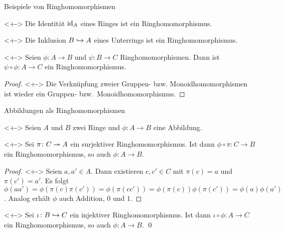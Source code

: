 \begin{frame}{Beispiele von Ringhomomorphismen}
    \begin{example}<+->
        Die Identität \(\operatorname{id}_A\) eines Ringes ist ein Ringhomomorphismus.
    \end{example}
    \begin{example}<+->
        Die Inklusion \(B \hookrightarrow A\) eines Unterrings ist ein Ringhomomorphismus.
    \end{example}
    \begin{proposition}<+->
        Seien \(\phi\colon A \to B\) und \(\psi\colon B \to C\)
        Ringhomomorphismen. Dann ist \(\psi \circ \phi\colon A \to C\) ein
        Ringhomomorphismus.
    \end{proposition}
    \begin{proof}<+->
        Die Verknüpfung zweier Gruppen- bzw. Monoidhomomorphismen ist wieder
        ein Gruppen- bzw.~Monoidhomomorphismus.
    \end{proof}
\end{frame}

\begin{frame}{Abbildungen als Ringhomomorphismen}
    \begin{visibleenv}<+->
        Seien \(A\) und \(B\) zwei Ringe und \(\phi\colon A \to B\) eine Abbildung.
    \end{visibleenv}
    \begin{proposition}<+->
        Sei \(\pi\colon C \twoheadrightarrow A\) ein surjektiver Ringhomomorphismus. Ist dann
        \(\phi \circ \pi\colon C \to B\) ein Ringhomomorphismus, so auch \(\phi\colon A \to B\).
    \end{proposition}
    \begin{proof}<+->
        Seien \(a, a' \in A\). Dann existieren \(c, c' \in C\) mit \(\pi(c) = a\)
        und \(\pi(c') = a'\).
        Es folgt \(\phi(a a') = \phi(\pi(c) \pi(c')) = \phi(\pi(c c')) = \phi(\pi(c))
        \phi(\pi(c')) = \phi(a) \phi(a')\). Analog erhält \(\phi\) auch Addition,
        \(0\) und \(1\).
    \end{proof}
    \begin{proposition}<+->
        Sei \(\iota\colon B \hookrightarrow C\) ein injektiver Ringhomomorphismus. Ist dann
        \(\iota \circ \phi\colon A \to C\) ein Ringhomomorphismus, so auch \(\phi\colon A \to B\).
        \qed
    \end{proposition}
\end{frame}

